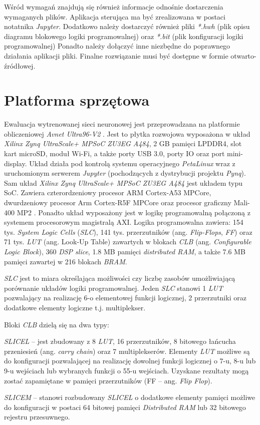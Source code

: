 Wśród wymagań znajdują się również informacje odnośnie dostarczenia wymaganych plików.
Aplikacja sterująca ma być zrealizowana w postaci notatnika \emph{Jupyter}.
Dodatkowo należy dostarczyć również pliki \emph{*.hwh} (plik opisu diagramu blokowego logiki programowalnej)
oraz \emph{*.bit} (plik konfiguracji logiki programowalnej) Ponadto należy dołączyć inne niezbędne do poprawnego działania aplikacji pliki. 
Finalne rozwiązanie musi być dostępne w formie otwarto-źródłowej.

\section{Platforma sprzętowa}
Ewaluacja wytrenowanej sieci neuronowej jest przeprowadzana na platformie obliczeniowej \emph{Avnet Ultra96-V2} \cite{avnet_ultra96}. 
Jest to płytka rozwojowa wyposażona w układ \emph{Xilinx Zynq UltraScale+ MPSoC ZU3EG A484}, 2 GB pamięci LPDDR4, slot kart microSD, moduł Wi-Fi, a także porty USB 3.0, porty IO oraz port mini-display. 
Układ działa pod kontrolą systemu operacyjnego \emph{PetaLinux} wraz z uruchomionym serwerem \emph{Jupyter} (pochodzących z dystrybucji projektu \emph{Pynq}\cite{pynq}). 
Sam układ \emph{Xilinx Zynq UltraScale+ MPSoC ZU3EG A484} jest układem typu SoC. 
Zawiera czterordzeniowy procesor ARM Cortex-A53 MPCore, dwurdzeniowy procesor Arm Cortex-R5F MPCore oraz procesor graficzny Mali-400 MP2 \cite{zynq_product_guide}. 
Ponadto układ wyposażony jest w logikę programowalną połączoną z systemem procesorowym magistralą AXI. 
Logika programowalna zawiera: 
154 tys. \emph{System Logic Cells} (\emph{SLC}), 
141 tys. przerzutników (ang. \emph{Flip-Flops}, \emph{FF}) 
oraz 71 tys. \emph{LUT} (ang. Look-Up Table) zawartych w blokach \emph{CLB} (ang. \emph{Configurable Logic Block}), 360 \emph{DSP slice}, 1.8 MB pamięci \emph{distributed RAM}, a także 7.6 MB pamięci zawartej w 216 blokach \emph{BRAM}. 

\emph{SLC} jest to miara określająca możliwości czy liczbę zasobów umożliwiającą porównanie układów logiki programowalnej.
Jeden \emph{SLC} stanowi 1 \emph{LUT} pozwalający na realizację 6-o elementowej funkcji logicznej, 2 przerzutniki oraz dodatkowe elementy logiczne t.j. multiplekser. 

Bloki \emph{CLB} \cite{clb} dzielą się na dwa typy:
\begin{description}
\item \emph{SLICEL} -- jest zbudowany z 8 \emph{LUT}, 16 przerzutników, 8 bitowego łańcucha przeniesień (ang. \emph{carry chain}) oraz 7 multiplekserów. 
Elementy \emph{LUT} możliwe są do konfiguracji pozwalającej na realizację dowolnej funkcji logicznej o 7-u, 8-u lub 9-u wejściach lub wybranych funkcji o 55-u wejściach. 
Uzyskane rezultaty mogą zostać zapamiętane w pamięci przerzutników (FF -- ang. \textit{Flip Flop}).
\item \emph{SLICEM} -- stanowi rozbudowany \emph{SLICEL} o dodatkowe elementy pamięci możliwe do konfiguracji w postaci 64 bitowej pamięci \emph{Distributed RAM} lub 32 bitowego rejestru przesuwnego. 
\end{description}

